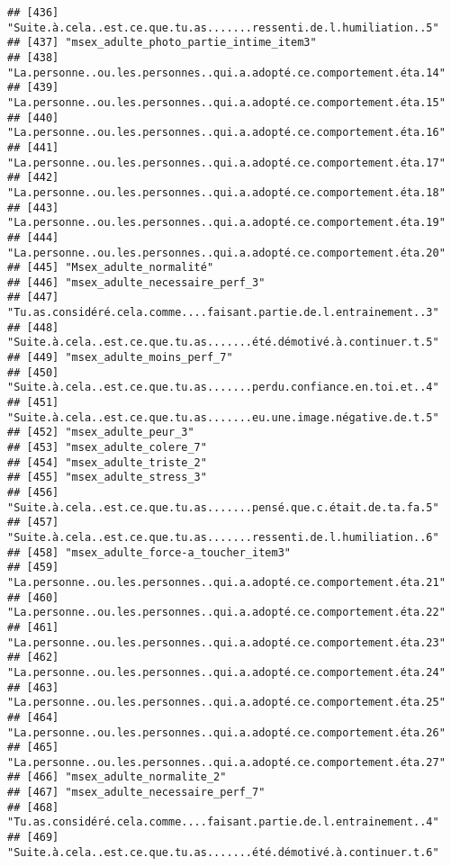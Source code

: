 \documentclass[
]{article}
\begin{document}
\begin{verbatim}
## [436] "Suite.à.cela..est.ce.que.tu.as.......ressenti.de.l.humiliation..5" 
## [437] "msex_adulte_photo_partie_intime_item3"                             
## [438] "La.personne..ou.les.personnes..qui.a.adopté.ce.comportement.éta.14"
## [439] "La.personne..ou.les.personnes..qui.a.adopté.ce.comportement.éta.15"
## [440] "La.personne..ou.les.personnes..qui.a.adopté.ce.comportement.éta.16"
## [441] "La.personne..ou.les.personnes..qui.a.adopté.ce.comportement.éta.17"
## [442] "La.personne..ou.les.personnes..qui.a.adopté.ce.comportement.éta.18"
## [443] "La.personne..ou.les.personnes..qui.a.adopté.ce.comportement.éta.19"
## [444] "La.personne..ou.les.personnes..qui.a.adopté.ce.comportement.éta.20"
## [445] "Msex_adulte_normalité"                                             
## [446] "msex_adulte_necessaire_perf_3"                                     
## [447] "Tu.as.considéré.cela.comme....faisant.partie.de.l.entrainement..3" 
## [448] "Suite.à.cela..est.ce.que.tu.as.......été.démotivé.à.continuer.t.5" 
## [449] "msex_adulte_moins_perf_7"                                          
## [450] "Suite.à.cela..est.ce.que.tu.as.......perdu.confiance.en.toi.et..4" 
## [451] "Suite.à.cela..est.ce.que.tu.as.......eu.une.image.négative.de.t.5" 
## [452] "msex_adulte_peur_3"                                                
## [453] "msex_adulte_colere_7"                                              
## [454] "msex_adulte_triste_2"                                              
## [455] "msex_adulte_stress_3"                                              
## [456] "Suite.à.cela..est.ce.que.tu.as.......pensé.que.c.était.de.ta.fa.5" 
## [457] "Suite.à.cela..est.ce.que.tu.as.......ressenti.de.l.humiliation..6" 
## [458] "msex_adulte_force-a_toucher_item3"                                 
## [459] "La.personne..ou.les.personnes..qui.a.adopté.ce.comportement.éta.21"
## [460] "La.personne..ou.les.personnes..qui.a.adopté.ce.comportement.éta.22"
## [461] "La.personne..ou.les.personnes..qui.a.adopté.ce.comportement.éta.23"
## [462] "La.personne..ou.les.personnes..qui.a.adopté.ce.comportement.éta.24"
## [463] "La.personne..ou.les.personnes..qui.a.adopté.ce.comportement.éta.25"
## [464] "La.personne..ou.les.personnes..qui.a.adopté.ce.comportement.éta.26"
## [465] "La.personne..ou.les.personnes..qui.a.adopté.ce.comportement.éta.27"
## [466] "msex_adulte_normalite_2"                                           
## [467] "msex_adulte_necessaire_perf_7"                                     
## [468] "Tu.as.considéré.cela.comme....faisant.partie.de.l.entrainement..4" 
## [469] "Suite.à.cela..est.ce.que.tu.as.......été.démotivé.à.continuer.t.6" 

\end{verbatim}
\end{document}
